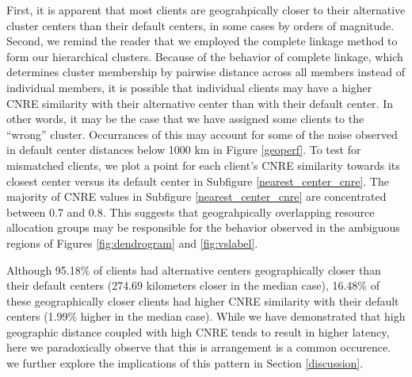 First, it is apparent that most clients are geograhpically closer to their
alternative cluster centers than their default centers, in some cases by orders
of magnitude. Second, we remind the reader that we employed the complete linkage
method to form our hierarchical clusters. Because of the behavior of complete
linkage, which determines cluster membership by pairwise distance across all
members instead of individual members, it is possible that individual clients
may have a higher CNRE similarity with their alternative center than with their
default center. In other words, it may be the case that we have assigned some
clients to the ``wrong'' cluster. Occurrances of this may account for some of
the noise observed in default center distances below 1000 km in Figure
\ref{geoperf}. To test for mismatched clients, we plot a point for each client's CNRE similarity
towards its closest center versus its default center in Subfigure
\ref{nearest_center_cnre}. The majority of CNRE
values in Subfigure \ref{nearest_center_cnre} are concentrated between 0.7 and
0.8. This suggests that geograhpically overlapping resource allocation groups
may be responsible for the behavior observed in the ambiguous regions of Figures
\ref{fig:dendrogram} and \ref{fig:vslabel}. 

Although 95.18\% of clients had alternative centers geographically closer than
their default centers (274.69 kilometers closer in the median case), 16.48\% of
these geographically closer 
clients had higher CNRE similarity with their default centers (1.99\% higher in
the median case). While we have demonstrated that high geographic distance
coupled with high CNRE tends to result in higher latency, here we paradoxically
observe that this is arrangement is a common occurence. we further explore the
implications of this pattern in Section \ref{discussion}.
